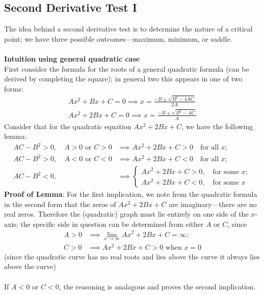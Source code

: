 \documentclass{report}
\begin{document}
\subsection{Second Derivative Test I}%
The idea behind a second derivative test is to determine the nature of a critical point; we have three
possible outcomes---maximum, minimum, or saddle.\\
\vspace{1mm}\\
\textbf{Intuition using general quadratic case}\\
First consider the formula for the roots of a general quadratic formula (can be derived by completing the square);
in general two this appears in one of two forms:
\begin{align*}
Ax^2+Bx+C=0\implies x=\frac{-B\pm\sqrt{B^2-4AC}}{2A}\\
Ax^2+2Bx+C=0\implies x=\frac{-B\pm\sqrt{B^2-AC}}{A}
\end{align*}
Consider that for the quadratic equation $Ax^2+2Bx+C$, we have the following lemma:
\begin{align*}
AC-B^2>0,\quad A>0\text{ or }C>0&\implies Ax^2+2Bx+C>0
\quad\text{for all }x;\\
AC-B^2>0,\quad A<0\text{ or }C<0&\implies Ax^2+2Bx+C<0
\quad\text{for all }x;\\
AC-B^2<0,\quad&\implies\begin{cases}
Ax^2+2Bx+C>0,\quad\text{for some }x;\\
Ax^2+2Bx+C<0,\quad\text{for some }x
\end{cases}
\end{align*}
\textbf{Proof of Lemma}: For the first implication, we note from the quadratic formula in the second form that
the zeros of $Ax^2+2Bx+C$ are imaginary---there are no real zeros. Therefore the (quadratic) graph must lie entirely
on one side of the $x$-axis; the specific side in question can be determined from either $A$ or $C$, since
\begin{align*}
A>0&\implies\lim_{x\to\infty}Ax^2+2Bx+C=\infty;\\
C>0&\implies Ax^2+2Bx+C>0\text{ when }x=0
\end{align*}
(since the quadratic curve has no real roots and lies above the curve it always lies above the curve)\\
\vspace{1mm}\\
If $A<0$ or $C<0$, the reasoning is analagous and proves the second implication.\\
\end{document}
